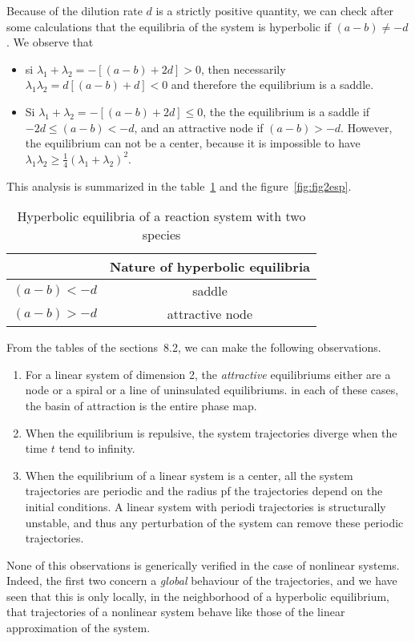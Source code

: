Because of the dilution rate $d$ is a strictly positive quantity, we can check after some calculations that the equilibria of the system is hyperbolic if $(a-b) \neq -d$. We observe that
\begin{itemize}
\item si $\lambda_1 + \lambda_2 = -[(a-b)+2d]>0$, then necessarily
$\lambda_1 \lambda_2 = d[(a-b)+d]<0$ and therefore the equilibrium is a saddle.
\item Si $\lambda_1 + \lambda_2 = -[(a-b)+2d]\leq 0$, the the equilibrium is a saddle
if $-2d\leq(a-b)<-d$, and an attractive node if $(a-b)>-d$.  However, the equilibrium can not be a center, because it is impossible to have
$\lambda_1 \lambda_2 \geq \frac{1}{4} (\lambda_1 + \lambda_2)^2$.
\end{itemize}
This analysis is summarized in the table~\ref{tab2esp} and the figure~\ref{fig:fig2esp}.

\begin{table}
\hspace*{10mm}
\renewcommand{\arraystretch}{3.0}
\begin{tabular}{|c|c|}
\hline
&
Nature of hyperbolic equilibria\\ \hline
$(a-b)<-d$&saddle \\ \hline
$(a-b)>-d$&attractive node\\ \hline
\end{tabular}
\caption{Hyperbolic equilibria of a reaction system with two species}
\label{tab2esp}
\end{table}


From the tables of the sections~8.2, we can make the following observations.
\begin{enumerate}
\item For a linear system of dimension 2, the {\em attractive} equilibriums either are a node or a spiral or a line of uninsulated equilibriums. in
each of these cases, the basin of attraction is the entire phase map.
\item When the equilibrium is repulsive, the system trajectories diverge when the time $t$ tend to infinity.
\item When the equilibrium of a linear system is a center, all the system trajectories are periodic and the radius pf the trajectories depend on the initial conditions.
A linear system with periodi trajectories is structurally unstable, and thus any perturbation of the system can remove these periodic trajectories.
\end{enumerate}
None of this observations is generically verified in the case of nonlinear systems. Indeed, the first two concern a {\em global} behaviour of the trajectories, and we have seen that this is only locally, in the neighborhood of a hyperbolic equilibrium, that
trajectories of a nonlinear system behave like those of the linear approximation of the system.


